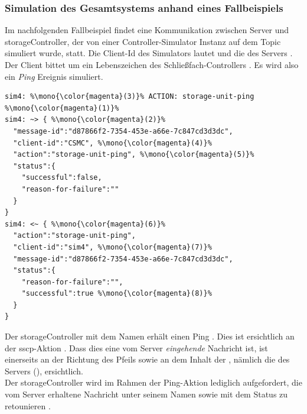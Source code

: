 \subsubsection{Simulation des Gesamtsystems anhand eines Fallbeispiels}
Im nachfolgenden Fallbeispiel findet eine Kommunikation zwischen Server und \gls{storageController}, der von einer Controller-Simulator Instanz auf dem Topic\\   simuliert wurde, statt. Die Client-Id des Simulators lautet  und die des Servers . Der Client bittet um ein Lebenszeichen des Schließfach-Controllers . Es wird also ein \textit{Ping} Ereignis simuliert.\\ \ColorfulCodeDisclaimer{}
\begin{lstlisting}[style=goMono,caption={\centering Eingehende und ausgehende Nachrichten aus der Perspektive des \gls{storageController}'s \textit{sim4}.},label={sec:impl:simulator:controller:ping}]
sim4: %\mono{\color{magenta}(3)}% ACTION: storage-unit-ping %\mono{\color{magenta}(1)}%
sim4: ~> { %\mono{\color{magenta}(2)}%
  "message-id":"d87866f2-7354-453e-a66e-7c847cd3d3dc",
  "client-id":"CSMC", %\mono{\color{magenta}(4)}%
  "action":"storage-unit-ping", %\mono{\color{magenta}(5)}%
  "status":{
    "successful":false,
    "reason-for-failure":""
  }
}
sim4: <~ { %\mono{\color{magenta}(6)}%
  "action":"storage-unit-ping", 
  "client-id":"sim4", %\mono{\color{magenta}(7)}%
  "message-id":"d87866f2-7354-453e-a66e-7c847cd3d3dc",
  "status":{
    "reason-for-failure":"",
    "successful":true %\mono{\color{magenta}(8)}%
  }
}
\end{lstlisting}
Der \gls{storageController} mit dem Namen   erhält einen Ping . Dies ist ersichtlich an der \acrshort{sscp}-Aktion  . Dass dies eine vom Server \textit{eingehende} Nachricht ist, ist einerseits an der Richtung des Pfeils  sowie an dem Inhalt der  , nämlich die des Servers (), ersichtlich.\\ Der \gls{storageController} wird im Rahmen der Ping-Aktion lediglich aufgefordert, die vom Server erhaltene Nachricht unter seinem Namen  sowie mit dem Status   zu retounieren .\bigskip   


